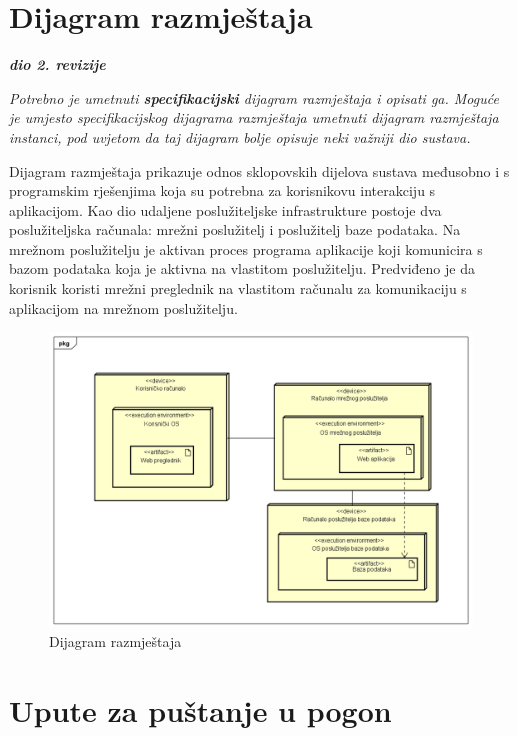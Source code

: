			\eject 
		
		
		\section{Dijagram razmještaja}
			
			\textbf{\textit{dio 2. revizije}}
			
			 \textit{Potrebno je umetnuti \textbf{specifikacijski} dijagram razmještaja i opisati ga. Moguće je umjesto specifikacijskog dijagrama razmještaja umetnuti dijagram razmještaja instanci, pod uvjetom da taj dijagram bolje opisuje neki važniji dio sustava.}
			 
			 \indent Dijagram razmještaja prikazuje odnos sklopovskih dijelova sustava međusobno i s programskim rješenjima koja su potrebna za korisnikovu interakciju s aplikacijom. Kao dio udaljene poslužiteljske infrastrukture postoje dva poslužiteljska računala: mrežni poslužitelj i poslužitelj baze podataka. Na mrežnom poslužitelju je aktivan proces programa aplikacije koji komunicira s bazom podataka koja je aktivna na vlastitom poslužitelju. Predviđeno je da korisnik koristi mrežni preglednik na vlastitom računalu za komunikaciju s aplikacijom na mrežnom poslužitelju.
			 
			 \begin{figure} [hbt!]
			 	\includegraphics[width=\linewidth]{Slike/DeploymentDiagram}
			 	\caption{Dijagram razmještaja}
			 \end{figure}
			
			\eject 
		
		\section{Upute za puštanje u pogon}
		
